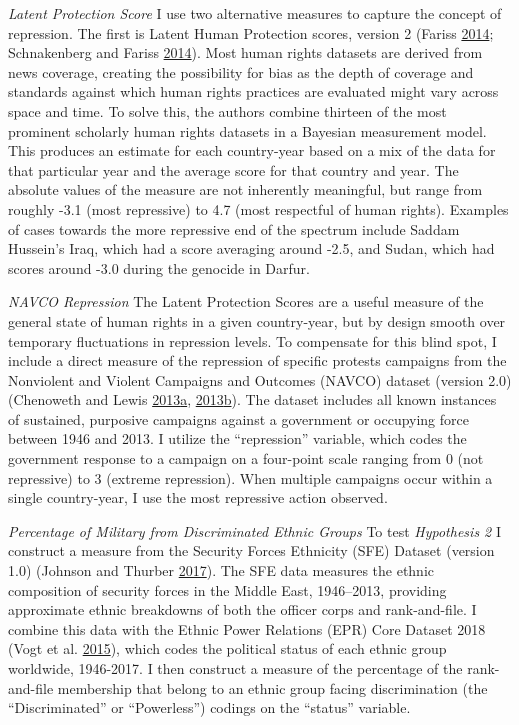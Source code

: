 \documentclass[12pt,]{article}
\theoremstyle{definition}
\theoremstyle{definition}
\theoremstyle{definition}
\theoremstyle{remark}
\begin{document}
\emph{Latent Protection Score} I use two alternative measures to capture
the concept of repression. The first is Latent Human Protection scores,
version 2 (Fariss \protect\hyperlink{ref-Fariss2014}{2014}; Schnakenberg
and Fariss \protect\hyperlink{ref-Schnakenberg2014}{2014}). Most human
rights datasets are derived from news coverage, creating the possibility
for bias as the depth of coverage and standards against which human
rights practices are evaluated might vary across space and time. To
solve this, the authors combine thirteen of the most prominent scholarly
human rights datasets in a Bayesian measurement model. This produces an
estimate for each country-year based on a mix of the data for that
particular year and the average score for that country and year. The
absolute values of the measure are not inherently meaningful, but range
from roughly -3.1 (most repressive) to 4.7 (most respectful of human
rights). Examples of cases towards the more repressive end of the
spectrum include Saddam Hussein's Iraq, which had a score averaging
around -2.5, and Sudan, which had scores around -3.0 during the genocide
in Darfur.

\emph{NAVCO Repression} The Latent Protection Scores are a useful
measure of the general state of human rights in a given country-year,
but by design smooth over temporary fluctuations in repression levels.
To compensate for this blind spot, I include a direct measure of the
repression of specific protests campaigns from the Nonviolent and
Violent Campaigns and Outcomes (NAVCO) dataset (version 2.0) (Chenoweth
and Lewis
\protect\hyperlink{ref-Chenoweth2013b}{2013}\protect\hyperlink{ref-Chenoweth2013b}{a},
\protect\hyperlink{ref-Chenoweth2013a}{2013}\protect\hyperlink{ref-Chenoweth2013a}{b}).
The dataset includes all known instances of sustained, purposive
campaigns against a government or occupying force between 1946 and 2013.
I utilize the ``repression'' variable, which codes the government
response to a campaign on a four-point scale ranging from 0 (not
repressive) to 3 (extreme repression). When multiple campaigns occur
within a single country-year, I use the most repressive action observed.

\emph{Percentage of Military from Discriminated Ethnic Groups} To test
\emph{Hypothesis 2} I construct a measure from the Security Forces
Ethnicity (SFE) Dataset (version 1.0) (Johnson and Thurber
\protect\hyperlink{ref-Johnson2017}{2017}). The SFE data measures the
ethnic composition of security forces in the Middle East, 1946--2013,
providing approximate ethnic breakdowns of both the officer corps and
rank-and-file. I combine this data with the Ethnic Power Relations (EPR)
Core Dataset 2018 (Vogt et al. \protect\hyperlink{ref-Vogt2015}{2015}),
which codes the political status of each ethnic group worldwide,
1946-2017. I then construct a measure of the percentage of the
rank-and-file membership that belong to an ethnic group facing
discrimination (the ``Discriminated'' or ``Powerless'') codings on the
``status'' variable.
\end{document}
